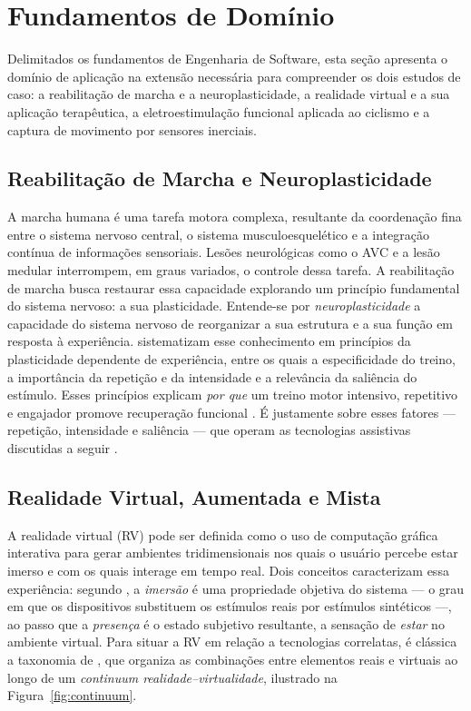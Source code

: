 \section{Fundamentos de Domínio}
\label{sec:dominio}

Delimitados os fundamentos de Engenharia de Software, esta seção apresenta o domínio de
aplicação na extensão necessária para compreender os dois estudos de caso: a reabilitação
de marcha e a neuroplasticidade, a realidade virtual e a sua aplicação terapêutica, a
eletroestimulação funcional aplicada ao ciclismo e a captura de movimento por sensores
inerciais.

\subsection{Reabilitação de Marcha e Neuroplasticidade}
\label{sec:neuroplasticidade}

A marcha humana é uma tarefa motora complexa, resultante da coordenação fina entre o
sistema nervoso central, o sistema musculoesquelético e a integração contínua de
informações sensoriais. Lesões neurológicas como o AVC e a lesão medular interrompem, em
graus variados, o controle dessa tarefa. A reabilitação de marcha busca restaurar essa
capacidade explorando um princípio fundamental do sistema nervoso: a sua plasticidade.
Entende-se por \emph{neuroplasticidade} a capacidade do sistema nervoso de reorganizar a
sua estrutura e a sua função em resposta à experiência. 
sistematizam esse conhecimento em princípios da plasticidade dependente de experiência,
entre os quais a especificidade do treino, a importância da repetição e da intensidade e a
relevância da saliência do estímulo. Esses princípios explicam \emph{por que} um treino
motor intensivo, repetitivo e engajador promove recuperação funcional
\cite{takeuchi2013}. É justamente sobre esses fatores --- repetição, intensidade e
saliência --- que operam as tecnologias assistivas discutidas a seguir
\cite{rajashekar2024,macchitella2023}.

\subsection{Realidade Virtual, Aumentada e Mista}
\label{sec:rv-ra-rm}

A realidade virtual (RV) pode ser definida como o uso de computação gráfica interativa para
gerar ambientes tridimensionais nos quais o usuário percebe estar imerso e com os quais
interage em tempo real. Dois conceitos caracterizam essa experiência: segundo
, a \emph{imersão} é uma propriedade objetiva do sistema --- o grau
em que os dispositivos substituem os estímulos reais por estímulos sintéticos ---, ao passo
que a \emph{presença} é o estado subjetivo resultante, a sensação de \emph{estar} no
ambiente virtual. Para situar a RV em relação a tecnologias correlatas, é clássica a
taxonomia de , que organiza as combinações entre elementos reais e
virtuais ao longo de um \emph{continuum realidade--virtualidade}, ilustrado na
Figura~\ref{fig:continuum}.

